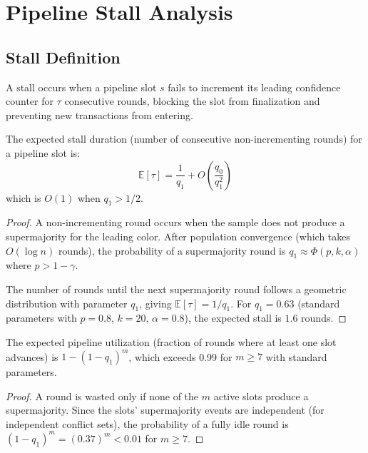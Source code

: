 \section{Pipeline Stall Analysis}

\label{sec:stalls}

\subsection{Stall Definition}

\begin{definition}
A stall occurs when a pipeline slot $s$ fails to increment its leading confidence
counter for $\tau$ consecutive rounds, blocking the slot from finalization and preventing
new transactions from entering.
\end{definition}

\begin{theorem}
\label{thm:stall}
The expected stall duration (number of consecutive non-incrementing rounds) for a
pipeline slot is:
\[
\mathbb{E}[\tau] = \frac{1}{q_1} + O\left(\frac{q_0}{q_1^2}\right)
\]
which is $O(1)$ when $q_1 > 1/2$.
\end{theorem}

\begin{proof}
A non-incrementing round occurs when the sample does not produce a supermajority for
the leading color. After population convergence (which takes $O(\log n)$ rounds), the
probability of a supermajority round is $q_1 \approx \Phi(p, k, \alpha)$ where $p > 1 - \gamma$.

The number of rounds until the next supermajority round follows a geometric distribution
with parameter $q_1$, giving $\mathbb{E}[\tau] = 1/q_1$. For $q_1 = 0.63$ (standard
parameters with $p = 0.8$, $k = 20$, $\alpha = 0.8$), the expected stall is $1.6$ rounds.
\end{proof}

\begin{corollary}
\label{cor:utilization}
The expected pipeline utilization (fraction of rounds where at least one slot advances)
is $1 - (1 - q_1)^m$, which exceeds 0.99 for $m \geq 7$ with standard parameters.
\end{corollary}

\begin{proof}
A round is wasted only if none of the $m$ active slots produce a supermajority. Since
the slots' supermajority events are independent (for independent conflict sets), the
probability of a fully idle round is $(1 - q_1)^m = (0.37)^m < 0.01$ for $m \geq 7$.
\end{proof}


